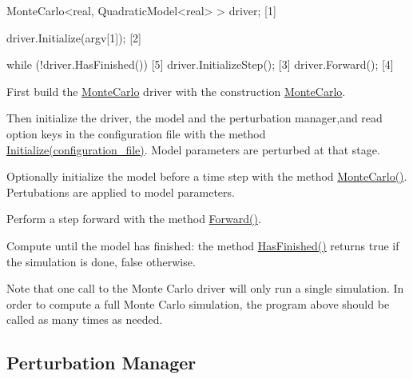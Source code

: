 \documentclass{tufte-book}
\begin{document}
\begin{frame_cpp}
MonteCarlo<real,  QuadraticModel<real> > driver; [1]

driver.Initialize(argv[1]); [2]

while (!driver.HasFinished()) [5]
{
    driver.InitializeStep(); [3]
    driver.Forward(); [4]
}
\end{frame_cpp}





\begin{DoxyEnumerate}
\item \-First build the {\ttfamily  \hyperlink{class_verdandi_1_1_monte_carlo}{\-Monte\-Carlo}} driver with the construction {\ttfamily  \hyperlink{class_verdandi_1_1_monte_carlo_a2cbaff4f3f90c79c7ccfcb9193699b60}{\-Monte\-Carlo}}.


\item \-Then initialize the driver, the model and the perturbation manager,and read option keys in the configuration file with the method {\ttfamily  \hyperlink{}{\-Initialize(configuration\-\_\-file)}}. \-Model parameters are perturbed at that stage.


\item \-Optionally initialize the model before a time step with the method {\ttfamily  \hyperlink{class_verdandi_1_1_monte_carlo_a0a89636757301c4d54d7d9d5adb979a2}{\-Monte\-Carlo()}}. \-Pertubations are applied to model parameters.


\item \-Perform a step forward with the method {\ttfamily  \hyperlink{class_verdandi_1_1_monte_carlo_a6f86578e17d6cc780238beb665033fa5}{\-Forward()}}.


\item \-Compute until the model has finished\-: the method {\ttfamily  \hyperlink{class_verdandi_1_1_monte_carlo_a2b111f15a0b75f1b9496d113c246f20f}{\-Has\-Finished()}} returns true if the simulation is done, false otherwise.
\end{DoxyEnumerate}



\-Note that one call to the \-Monte \-Carlo driver will only run a single simulation. \-In order to compute a full \-Monte \-Carlo simulation, the program above should be called as many times as needed.









 \hypertarget{perturbation_manager}{}\subsection{\-Perturbation Manager}\label{perturbation_manager}
\end{document}
